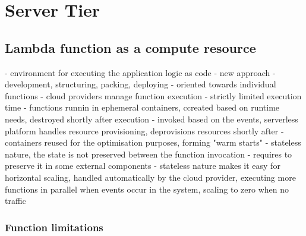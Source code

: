 

\section{Server Tier}

\label{chapter:examples-receipt-processing}
\label{chapter:examples-generating-interactive-slideshow-based-on-latex-files}

\subsection{Lambda function as a compute resource}

\label{chapter:serverless-faas}
- environment for executing the application logic as code
- new approach - development, structuring, packing, deploying - oriented towards individual functions
- cloud providers manage function execution
- strictly limited execution time
- functions runnin in ephemeral containers, ccreated based on runtime needs, destroyed shortly after execution
- invoked based on the events, serverless platform handles resource provisioning, deprovisions resources shortly after - containers reused for the optimisation purposes, forming "warm starts"
- stateless nature, the state is not preserved between the function invocation - requires to preserve it in some external components
- stateless nature makes it easy for horizontal scaling, handled automatically by the cloud provider, executing more functions in parallel when events occur in the system, scaling to zero when no traffic

\subsubsection{Function limitations}

